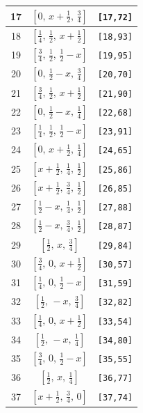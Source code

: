 \documentclass[fleqn,8pt]{jsarticle}
\begin{document}
\begin{longtable}{ccc}
17 & $\left[ 0,\, x + \frac{1}{2},\, \frac{3}{4} \right]$ & {\tt [17,72]} \\ \hline
18 & $\left[ \frac{1}{4},\, \frac{1}{2},\, x + \frac{1}{2} \right]$ & {\tt [18,93]} \\ \hline
19 & $\left[ \frac{3}{4},\, \frac{1}{2},\, \frac{1}{2} - x \right]$ & {\tt [19,95]} \\ \hline
20 & $\left[ 0,\, \frac{1}{2} - x,\, \frac{3}{4} \right]$ & {\tt [20,70]} \\ \hline
21 & $\left[ \frac{3}{4},\, \frac{1}{2},\, x + \frac{1}{2} \right]$ & {\tt [21,90]} \\ \hline
22 & $\left[ 0,\, \frac{1}{2} - x,\, \frac{1}{4} \right]$ & {\tt [22,68]} \\ \hline
23 & $\left[ \frac{1}{4},\, \frac{1}{2},\, \frac{1}{2} - x \right]$ & {\tt [23,91]} \\ \hline
24 & $\left[ 0,\, x + \frac{1}{2},\, \frac{1}{4} \right]$ & {\tt [24,65]} \\ \hline
25 & $\left[ x + \frac{1}{2},\, \frac{1}{4},\, \frac{1}{2} \right]$ & {\tt [25,86]} \\ \hline
26 & $\left[ x + \frac{1}{2},\, \frac{3}{4},\, \frac{1}{2} \right]$ & {\tt [26,85]} \\ \hline
27 & $\left[ \frac{1}{2} - x,\, \frac{1}{4},\, \frac{1}{2} \right]$ & {\tt [27,88]} \\ \hline
28 & $\left[ \frac{1}{2} - x,\, \frac{3}{4},\, \frac{1}{2} \right]$ & {\tt [28,87]} \\ \hline
29 & $\left[ \frac{1}{2},\, x,\, \frac{3}{4} \right]$ & {\tt [29,84]} \\ \hline
30 & $\left[ \frac{3}{4},\, 0,\, x + \frac{1}{2} \right]$ & {\tt [30,57]} \\ \hline
31 & $\left[ \frac{1}{4},\, 0,\, \frac{1}{2} - x \right]$ & {\tt [31,59]} \\ \hline
32 & $\left[ \frac{1}{2},\, - x,\, \frac{3}{4} \right]$ & {\tt [32,82]} \\ \hline
33 & $\left[ \frac{1}{4},\, 0,\, x + \frac{1}{2} \right]$ & {\tt [33,54]} \\ \hline
34 & $\left[ \frac{1}{2},\, - x,\, \frac{1}{4} \right]$ & {\tt [34,80]} \\ \hline
35 & $\left[ \frac{3}{4},\, 0,\, \frac{1}{2} - x \right]$ & {\tt [35,55]} \\ \hline
36 & $\left[ \frac{1}{2},\, x,\, \frac{1}{4} \right]$ & {\tt [36,77]} \\ \hline
37 & $\left[ x + \frac{1}{2},\, \frac{3}{4},\, 0 \right]$ & {\tt [37,74]} \\ \hline

\end{longtable}
\end{document}
